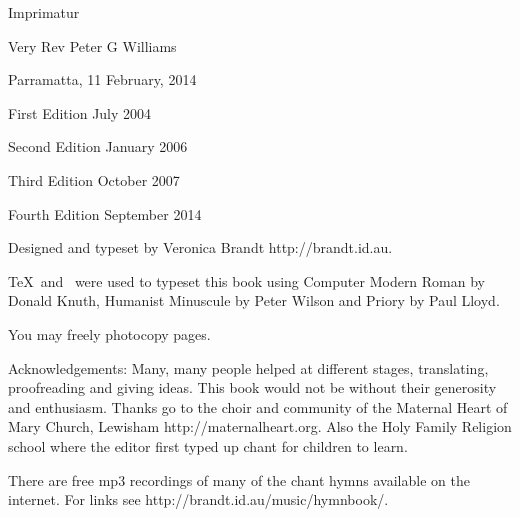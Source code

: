 {\raggedright
{}

\parindent=0mm
\parskip=6pt

Imprimatur
\centerline{Very Rev Peter G Williams}
\rmlyrics

Parramatta, 11 February, 2014

\vfill

First Edition July 2004

Second Edition January 2006

Third Edition October 2007


Fourth Edition September 2014

Designed and typeset by Veronica Brandt http://brandt.id.au.

\TeX\ and \OpusTeX\ were used to typeset this book using
          Computer Modern Roman by Donald Knuth,
          Humanist Minuscule by Peter Wilson
          and Priory by Paul Lloyd.



You may freely photocopy pages.



Acknowledgements:  Many, many people helped at different stages,
translating, proofreading and giving ideas.  This book would not
be without their generosity and enthusiasm.
Thanks go to the choir and community of the Maternal Heart of Mary
Church, Lewisham http://maternalheart.org.  Also the Holy Family 
Religion school where the editor first typed up chant for children
to learn. 

There are free mp3 recordings of many of the chant hymns available
on the internet.  For links see http://brandt.id.au/music/hymnbook/.



}

